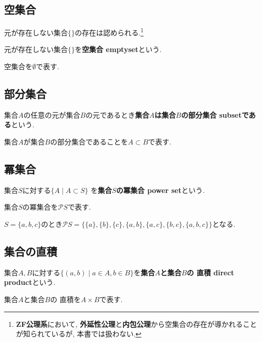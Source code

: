 \subsection{空集合}
元が存在しない集合$\{\}$の存在は認められる.\footnote{{\bf ZF公理系}において, {\bf 外延性公理}と{\bf 内包公理}から空集合の存在が導かれることが知られているが, 本書では扱わない.}
\begin{Def}
元が存在しない集合$\{\}$を{\bf 空集合 emptyset}という.
\end{Def}
\begin{Notation}
空集合を$\emptyset$で表す.
\end{Notation}
\subsection{部分集合}
\begin{Def}
集合$A$の任意の元が集合$B$の元であるとき{\bf 集合$A$は集合$B$の部分集合 subsetである}という.  
\end{Def}
\begin{Notation}
集合$A$が集合$B$の部分集合であることを$A\subset B$で表す.
\end{Notation}
\subsection{冪集合}
\begin{Def}
集合$S$に対する$\{A\mid A\subset S\}$
を{\bf 集合$S$の冪集合 power set}という.
\end{Def}
\begin{Notation}
集合$S$の冪集合を$\mathcal{P}S$で表す.
\end{Notation}
\begin{example}
$S=\{a,b,c\}$のとき$\mathcal{P} S=\{\{a\},\{b\},\{c\},\{a,b\},\{a,c\},\{b,c\},\{a,b,c\}\}$となる.
\end{example}

\subsection{集合の直積}
\begin{Def}
集合$A,B$に対する$\{(a,b)\mid a\in A, b\in B\}$を{\bf 集合$A$と集合$B$の
直積 direct product}という.
\end{Def}
\begin{Notation}
集合$A$と集合$B$の
直積を$A\times B$で表す.
\end{Notation}
\begin{comment}
実は, 集合を「ものの集まり」と素朴に定義することは, 矛盾を孕んでいる. この矛盾を避けるための議論はのちに行う. 
\end{comment}

